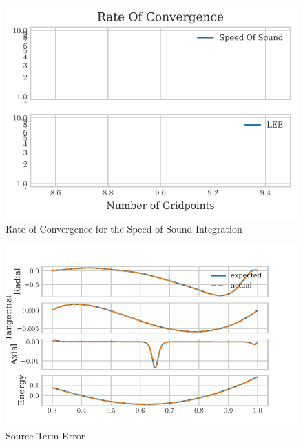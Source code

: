 \documentclass[12pt]{uthesis-v12}  %
\begin{document}
 \begin{figure}
     \centering
         \includegraphics[width=\textwidth]{Chapter-5-Results/tex-outputs/ROC_R1.pdf}
     \caption{Rate of Convergence for the Speed of Sound Integration}
 \end{figure}

 \begin{figure}
     \centering
         \includegraphics[width=\textwidth]{Chapter-5-Results/tex-outputs/SourceTermData_R1.pdf}
     \caption{Source Term Error}
 \end{figure}
%
%    
%    
%    
%    
%    
%     
%    
%     
%
\end{document}
